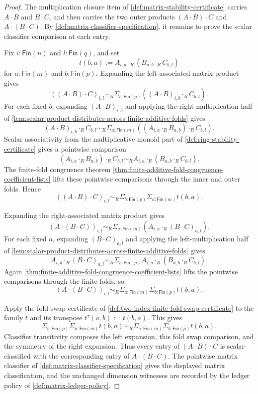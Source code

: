 \begin{proof}
The multiplication closure item of \autoref{def:matrix-stability-certificate} carries $A\cdot B$ and $B\cdot C$, and then carries the two outer products $(A\cdot B)\cdot C$ and $A\cdot(B\cdot C)$. By \autoref{def:matrix-classifier-specification}, it remains to prove the scalar classifier comparison at each entry.

Fix $i:\mathsf{Fin}(n)$ and $l:\mathsf{Fin}(q)$, and set
$$
t(b,a):=A_{i,a}\cdot_R(B_{a,b}\cdot_R C_{b,l})
$$
for $a:\mathsf{Fin}(m)$ and $b:\mathsf{Fin}(p)$. Expanding the left-associated matrix product gives
$$
((A\cdot B)\cdot C)_{i,l}
\sim_R
\Sigma_{b:\mathsf{Fin}(p)}((A\cdot B)_{i,b}\cdot_R C_{b,l}).
$$
For each fixed $b$, expanding $(A\cdot B)_{i,b}$ and applying the right-multiplication half of \autoref{lem:scalar-product-distributes-across-finite-additive-folds} gives
$$
(A\cdot B)_{i,b}\cdot_R C_{b,l}
\sim_R
\Sigma_{a:\mathsf{Fin}(m)}((A_{i,a}\cdot_R B_{a,b})\cdot_R C_{b,l}).
$$
Scalar associativity from the multiplicative monoid part of \autoref{def:ring-stability-certificate} gives a pointwise comparison
$$
(A_{i,a}\cdot_R B_{a,b})\cdot_R C_{b,l}
\sim_R
A_{i,a}\cdot_R(B_{a,b}\cdot_R C_{b,l}).
$$
The finite-fold congruence theorem \autoref{thm:finite-additive-fold-congruence-coefficient-lists} lifts these pointwise comparisons through the inner and outer folds. Hence
$$
((A\cdot B)\cdot C)_{i,l}
\sim_R
\Sigma_{b:\mathsf{Fin}(p)}\Sigma_{a:\mathsf{Fin}(m)}t(b,a).
$$

Expanding the right-associated matrix product gives
$$
(A\cdot(B\cdot C))_{i,l}
\sim_R
\Sigma_{a:\mathsf{Fin}(m)}(A_{i,a}\cdot_R(B\cdot C)_{a,l}).
$$
For each fixed $a$, expanding $(B\cdot C)_{a,l}$ and applying the left-multiplication half of \autoref{lem:scalar-product-distributes-across-finite-additive-folds} gives
$$
A_{i,a}\cdot_R(B\cdot C)_{a,l}
\sim_R
\Sigma_{b:\mathsf{Fin}(p)}A_{i,a}\cdot_R(B_{a,b}\cdot_R C_{b,l}).
$$
Again \autoref{thm:finite-additive-fold-congruence-coefficient-lists} lifts the pointwise comparisons through the finite folds, so
$$
(A\cdot(B\cdot C))_{i,l}
\sim_R
\Sigma_{a:\mathsf{Fin}(m)}\Sigma_{b:\mathsf{Fin}(p)}t(b,a).
$$

Apply the fold swap certificate of \autoref{def:two-index-finite-fold-swap-certificate} to the family $t$ and its transpose $t^\tau(a,b):=t(b,a)$. This gives
$$
\Sigma_{b:\mathsf{Fin}(p)}\Sigma_{a:\mathsf{Fin}(m)}t(b,a)
\sim_R
\Sigma_{a:\mathsf{Fin}(m)}\Sigma_{b:\mathsf{Fin}(p)}t(b,a).
$$
Classifier transitivity composes the left expansion, this fold swap comparison, and the symmetry of the right expansion. Thus every entry of $(A\cdot B)\cdot C$ is scalar-classified with the corresponding entry of $A\cdot(B\cdot C)$. The pointwise matrix classifier of \autoref{def:matrix-classifier-specification} gives the displayed matrix classification, and the unchanged dimension witnesses are recorded by the ledger policy of \autoref{def:matrix-ledger-policy}.
\end{proof}

